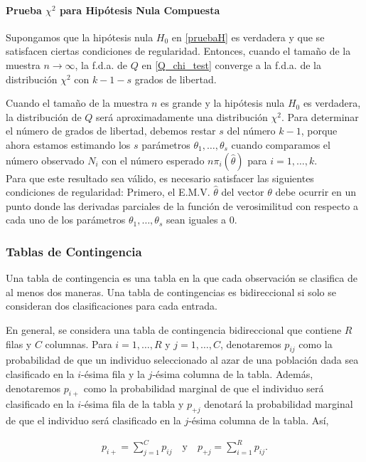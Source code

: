 \documentclass{book}
\begin{document}
\paragraph{Prueba $\chi^2$ para Hipótesis Nula Compuesta}

Supongamos que la hipótesis nula $H_0$ en \ref{pruebaH} es verdadera y que se satisfacen ciertas condiciones de regularidad. Entonces, cuando el tamaño de la muestra $n \to \infty$, la f.d.a. de $Q$ en \ref{Q_chi_test} converge a la f.d.a. de la distribución $\chi^2$ con $k - 1 - s$ grados de libertad.

Cuando el tamaño de la muestra $n$ es grande y la hipótesis nula $H_0$ es verdadera, la distribución de $Q$ será aproximadamente una distribución $\chi^2$. Para determinar el número de grados de libertad, debemos restar $s$ del número $k - 1$, porque ahora estamos estimando los $s$ parámetros $\theta_1, \ldots, \theta_s$ cuando comparamos el número observado $N_i$ con el número esperado $n\pi_i(\hat{\theta})$ para $i = 1, \ldots, k$. \\ 
Para que este resultado sea válido, es necesario satisfacer las siguientes condiciones de regularidad: Primero, el E.M.V. $\hat{\theta}$ del vector $\theta$ debe ocurrir en un punto donde las derivadas parciales de la función de verosimilitud con respecto a cada uno de los parámetros $\theta_1, \ldots, \theta_s$ sean iguales a 0.

\subsubsection{Tablas de Contingencia}
Una tabla de contingencia es una tabla en la que cada observación se clasifica de al menos dos maneras.
Una tabla de contingencias es bidireccional si solo se consideran dos clasificaciones para cada entrada.

En general, se considera una tabla de contingencia bidireccional que contiene $R$ filas y $C$ columnas. Para $i = 1, \ldots, R$ y $j = 1, \ldots, C$, denotaremos $p_{ij}$ como la probabilidad de que un individuo seleccionado al azar de una población dada sea clasificado en la $i$-ésima fila y la $j$-ésima columna de la tabla. Además, denotaremos $p_{i+}$ como la probabilidad marginal de que el individuo será clasificado en la $i$-ésima fila de la tabla y $p_{+j}$ denotará la probabilidad marginal de que el individuo será clasificado en la $j$-ésima columna de la tabla. Así,

\begin{align}
p_{i+} = \sum_{j=1}^{C} p_{ij} \quad \text{y} \quad p_{+j} = \sum_{i=1}^{R} p_{ij}.
\end{align}
\end{document}
